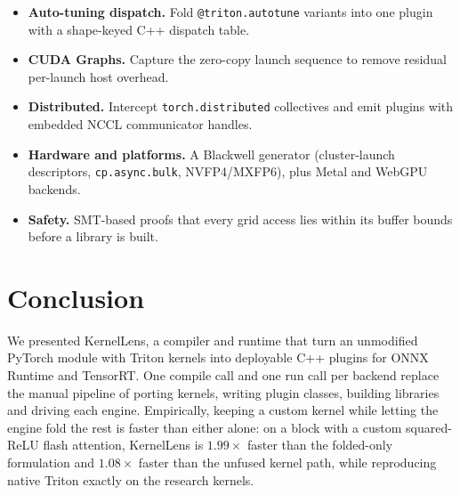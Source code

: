 \documentclass[11pt,a4paper]{article}
\begin{document}
\begin{itemize}[leftmargin=1.5em]
    \item \textbf{Auto-tuning dispatch.} Fold \texttt{@triton.autotune} variants
    into one plugin with a shape-keyed C++ dispatch table.
    \item \textbf{CUDA Graphs.} Capture the zero-copy launch sequence to remove
    residual per-launch host overhead.
    \item \textbf{Distributed.} Intercept \texttt{torch.distributed} collectives
    and emit plugins with embedded NCCL communicator handles.
    \item \textbf{Hardware and platforms.} A Blackwell generator
    (cluster-launch descriptors, \texttt{cp.async.bulk}, NVFP4/MXFP6), plus
    Metal and WebGPU backends.
    \item \textbf{Safety.} SMT-based proofs that every grid access lies within
    its buffer bounds before a library is built.
\end{itemize}

\section{Conclusion}

We presented KernelLens, a compiler and runtime that turn an unmodified PyTorch
module with Triton kernels into deployable C++ plugins for ONNX Runtime and
TensorRT. One compile call and one run call per backend replace the manual
pipeline of porting kernels, writing plugin classes, building libraries and
driving each engine. Empirically, keeping a custom kernel while letting the
engine fold the rest is faster than either alone: on a block with a custom
squared-ReLU flash attention, KernelLens is $1.99\times$ faster than the
folded-only formulation and $1.08\times$ faster than the unfused kernel path,
while reproducing native Triton exactly on the research kernels.
\end{document}
